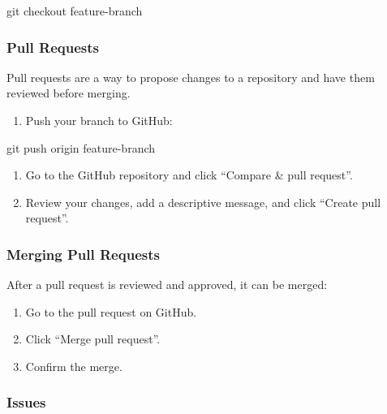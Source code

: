 \documentclass[
  letterpaper,
  DIV=11,
  numbers=noendperiod]{scrreprt}
\newenvironment{Shaded}{\begin{snugshade}}{\end{snugshade}}
\newcommand{\FunctionTok}[1]{\textcolor[rgb]{0.28,0.35,0.67}{#1}}
\newcommand{\NormalTok}[1]{\textcolor[rgb]{0.00,0.23,0.31}{#1}}
\providecommand{\tightlist}{%
  \setlength{\itemsep}{0pt}\setlength{\parskip}{0pt}}\usepackage{longtable,booktabs,array}
\begin{document}
\begin{Shaded}
\begin{Highlighting}[]
\FunctionTok{git}\NormalTok{ checkout feature{-}branch}
\end{Highlighting}
\end{Shaded}

\subsubsection{Pull Requests}\label{pull-requests}

Pull requests are a way to propose changes to a repository and have them
reviewed before merging.

\begin{enumerate}
\def\labelenumi{\arabic{enumi}.}
\tightlist
\item
  Push your branch to GitHub:
\end{enumerate}

\begin{Shaded}
\begin{Highlighting}[]
\FunctionTok{git}\NormalTok{ push origin feature{-}branch}
\end{Highlighting}
\end{Shaded}

\begin{enumerate}
\def\labelenumi{\arabic{enumi}.}
\setcounter{enumi}{1}
\tightlist
\item
  Go to the GitHub repository and click ``Compare \& pull request''.
\item
  Review your changes, add a descriptive message, and click ``Create
  pull request''.
\end{enumerate}

\subsubsection{Merging Pull Requests}\label{merging-pull-requests}

After a pull request is reviewed and approved, it can be merged:

\begin{enumerate}
\def\labelenumi{\arabic{enumi}.}
\tightlist
\item
  Go to the pull request on GitHub.
\item
  Click ``Merge pull request''.
\item
  Confirm the merge.
\end{enumerate}

\subsubsection{Issues}\label{issues}
\end{document}
